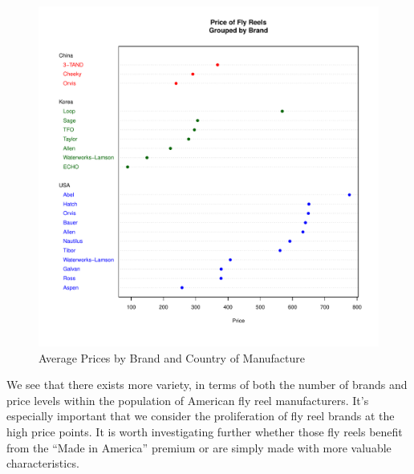 \begin{figure}[h!]
  \centering
  \includegraphics[scale = 0.5, keepaspectratio=true]{../Figures/dotchart_brand_country}
  \caption{Average Prices by Brand and Country of Manufacture} \label{fig:dotchart_brand_country}
\end{figure}

We see that there exists more variety, 
in terms of both the number of brands and price levels
within the population of American fly reel manufacturers. 
It's especially important that we consider the proliferation of 
fly reel brands at the high price points.
It is worth investigating further whether those fly reels
benefit from the ``Made in America'' premium
or are simply made with more valuable characteristics. 


% 
